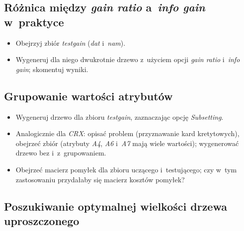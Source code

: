 \subsection{Różnica między \emph{gain ratio} a~\emph{info gain} w~praktyce}

\begin{itemize}
\item Obejrzyj zbiór \emph{testgain} (\emph{dat} i~\emph{nam}).
\item Wygeneruj dla niego dwukrotnie drzewo z~użyciem opcji \emph{gain ratio} i~\emph{info gain}; skomentuj wyniki.
\end{itemize}

\subsection{Grupowanie wartości atrybutów}

\begin{itemize}
\item Wygeneruj drzewo dla zbioru \emph{testgain}, zaznaczając opcję \emph{Subsetting}.
\item Analogicznie dla \emph{CRX}: opisać problem (przyznawanie kard kretytowych), obejrzeć zbiór (atrybuty \emph{A4}, \emph{A6} i~\emph{A7} mają wiele wartości); wygenerować drzewo bez i~z~grupowaniem.
\item Obejrzeć macierz pomyłek dla zbioru uczącego i~testującego; czy w~tym zastosowaniu przydałaby się macierz kosztów pomyłek?
\end{itemize}

\subsection{Poszukiwanie optymalnej wielkości drzewa uproszczonego}

